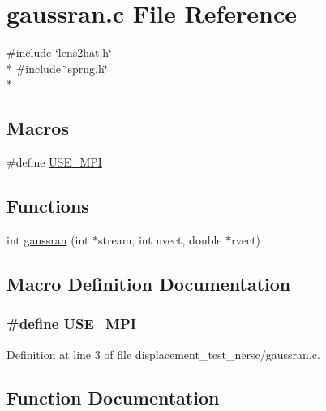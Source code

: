 \section{gaussran.\-c File Reference}
\label{displacement__test__nersc_2gaussran_8c}
{\ttfamily \#include \char`\"{}lens2hat.\-h\char`\"{}}\\*
{\ttfamily \#include \char`\"{}sprng.\-h\char`\"{}}\\*
\subsection*{Macros}
\begin{DoxyCompactItemize}
\item 
\#define \hyperlink{displacement__test__nersc_2gaussran_8c_a3869d282031f6ea6b50fdb980b758420}{U\-S\-E\-\_\-\-M\-P\-I}
\end{DoxyCompactItemize}
\subsection*{Functions}
\begin{DoxyCompactItemize}
\item 
int \hyperlink{displacement__test__nersc_2gaussran_8c_a467c7a00719892a0f87fc03e4c93c2ae}{gaussran} (int $\ast$stream, int nvect, double $\ast$rvect)
\end{DoxyCompactItemize}


\subsection{Macro Definition Documentation}
\subsubsection[{U\-S\-E\-\_\-\-M\-P\-I}]{\setlength{\rightskip}{0pt plus 5cm}\#define U\-S\-E\-\_\-\-M\-P\-I}\label{displacement__test__nersc_2gaussran_8c_a3869d282031f6ea6b50fdb980b758420}


Definition at line 3 of file displacement\-\_\-test\-\_\-nersc/gaussran.\-c.



\subsection{Function Documentation}
